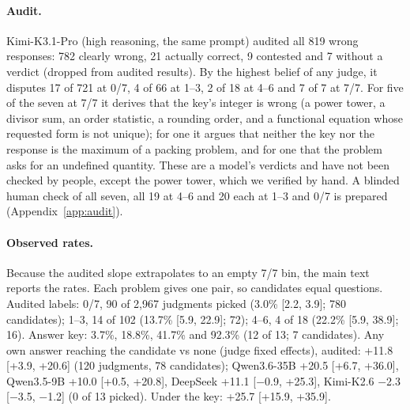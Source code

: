 \documentclass[11pt]{article}
\begin{document}
\paragraph{Audit.} Kimi-K3.1-Pro (high reasoning, the same prompt) audited all 819 wrong responses: 782 clearly
wrong, 21 actually correct, 9 contested and 7 without a verdict (dropped from audited results). By the highest
belief of any judge, it disputes 17 of 721 at 0/7, 4 of 66 at 1--3, 2 of 18 at 4--6 and 7 of 7 at 7/7. For five of
the seven at 7/7 it derives that the key's integer is wrong (a power tower, a divisor sum, an order statistic, a
rounding order, and a functional equation whose requested form is not unique); for one it argues that neither the
key nor the response is the maximum of a packing problem, and for one that the problem asks for an undefined
quantity. These are a model's verdicts and have not been checked by people, except the power tower, which we
verified by hand. A blinded human check of all seven, all 19 at 4--6 and 20 each at 1--3 and 0/7 is prepared
(Appendix~\ref{app:audit}).

\paragraph{Observed rates.} Because the audited slope extrapolates to an empty 7/7 bin, the main text reports the
rates. Each problem gives one pair, so candidates equal questions. Audited labels: 0/7, 90 of 2,967 judgments picked
(3.0\% [2.2, 3.9]; 780 candidates); 1--3, 14 of 102 (13.7\% [5.9, 22.9]; 72); 4--6, 4 of 18 (22.2\% [5.9, 38.9]; 16).
Answer key: 3.7\%, 18.8\%, 41.7\% and 92.3\% (12 of 13; 7 candidates). Any own answer reaching the candidate vs none
(judge fixed effects), audited: +11.8 [+3.9, +20.6] (120 judgments, 78 candidates); Qwen3.6-35B +20.5 [+6.7, +36.0],
Qwen3.5-9B +10.0 [+0.5, +20.8], DeepSeek +11.1 [$-$0.9, +25.3], Kimi-K2.6 $-$2.3 [$-$3.5, $-$1.2] (0 of 13 picked).
Under the key: +25.7 [+15.9, +35.9].
\end{document}
